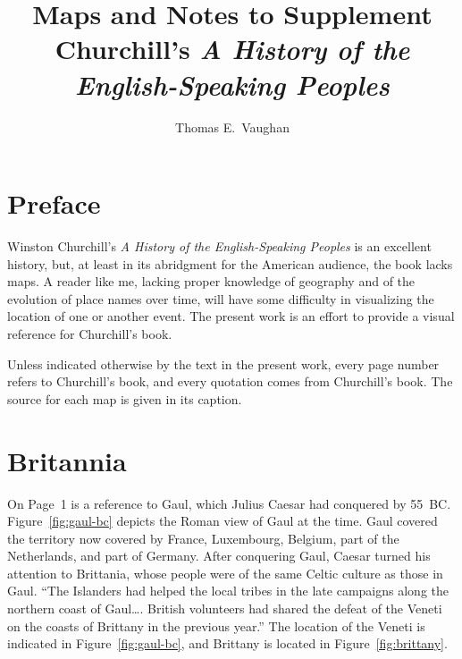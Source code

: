 \documentclass[twocolumn]{book}
\title{Maps and Notes to Supplement Churchill's {\it A History of the
English-Speaking Peoples\/}}
\author{Thomas E.~Vaughan}
\begin{document}
\frontmatter

\maketitle

\chapter{Preface}

Winston Churchill's {\it A History of the English-Speaking Peoples\/} is an
excellent history, but, at least in its abridgment for the American audience,
the book lacks maps. A reader like me, lacking proper knowledge of geography
and of the evolution of place names over time, will have some difficulty in
visualizing the location of one or another event. The present work is an effort
to provide a visual reference for Churchill's book.

Unless indicated otherwise by the text in the present work, every page number
refers to Churchill's book, and every quotation comes from Churchill's book.
The source for each map is given in its caption.

\mainmatter%

\chapter{Britannia}

On Page~1 is a reference to Gaul, which Julius Caesar had conquered by 55~BC\@.
Figure~\ref{fig:gaul-bc} depicts the Roman view of Gaul at the time. Gaul
covered the territory now covered by France, Luxembourg, Belgium, part of the
Netherlands, and part of Germany.  After conquering Gaul, Caesar turned his
attention to Brittania, whose people were of the same Celtic culture as those
in Gaul. ``The Islanders had helped the local tribes in the late campaigns
along the northern coast of Gaul\ldots.  British volunteers had shared the
defeat of the Veneti on the coasts of Brittany in the previous year.'' The
location of the Veneti is indicated in Figure~\ref{fig:gaul-bc}, and Brittany
is located in Figure~\ref{fig:brittany}.
\end{document}

